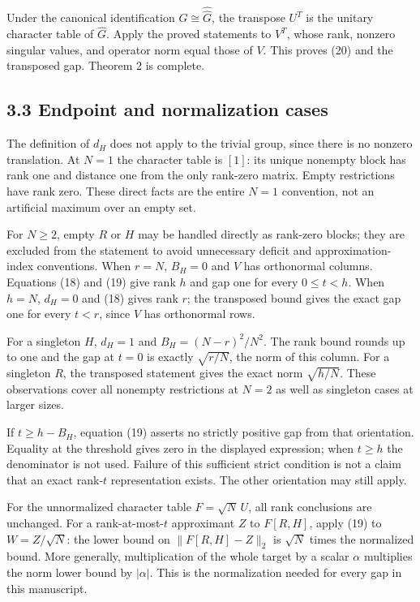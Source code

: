 \documentclass[
  11pt,
  letterpaper,
]{article}
\begin{document}
Under the canonical identification \(G\cong\widehat{\widehat G}\), the
transpose \(U^T\) is the unitary character table of \(\widehat G\).
Apply the proved statements to \(V^T\), whose rank, nonzero singular
values, and operator norm equal those of \(V\). This proves (20) and the
transposed gap. Theorem 2 is complete.

\subsection{3.3 Endpoint and normalization
cases}\label{endpoint-and-normalization-cases}

The definition of \(d_H\) does not apply to the trivial group, since
there is no nonzero translation. At \(N=1\) the character table is
\([1]\): its unique nonempty block has rank one and distance one from
the only rank-zero matrix. Empty restrictions have rank zero. These
direct facts are the entire \(N=1\) convention, not an artificial
maximum over an empty set.

For \(N\geq2\), empty \(R\) or \(H\) may be handled directly as
rank-zero blocks; they are excluded from the statement to avoid
unnecessary deficit and approximation-index conventions. When \(r=N\),
\(B_H=0\) and \(V\) has orthonormal columns. Equations (18) and (19)
give rank \(h\) and gap one for every \(0\leq t<h\). When \(h=N\),
\(d_H=0\) and (18) gives rank \(r\); the transposed bound gives the
exact gap one for every \(t<r\), since \(V\) has orthonormal rows.

For a singleton \(H\), \(d_H=1\) and \(B_H=(N-r)^2/N^2\). The rank bound
rounds up to one and the gap at \(t=0\) is exactly \(\sqrt{r/N}\), the
norm of this column. For a singleton \(R\), the transposed statement
gives the exact norm \(\sqrt{h/N}\). These observations cover all
nonempty restrictions at \(N=2\) as well as singleton cases at larger
sizes.

If \(t\geq h-B_H\), equation (19) asserts no strictly positive gap from
that orientation. Equality at the threshold gives zero in the displayed
expression; when \(t\geq h\) the denominator is not used. Failure of
this sufficient strict condition is not a claim that an exact rank-\(t\)
representation exists. The other orientation may still apply.

For the unnormalized character table \(F=\sqrt N\,U\), all rank
conclusions are unchanged. For a rank-at-most-\(t\) approximant \(Z\) to
\(F[R,H]\), apply (19) to \(W=Z/\sqrt N\): the lower bound on
\(\|F[R,H]-Z\|_2\) is \(\sqrt N\) times the normalized bound. More
generally, multiplication of the whole target by a scalar \(\alpha\)
multiplies the norm lower bound by \(|\alpha|\). This is the
normalization needed for every gap in this manuscript.
\end{document}
